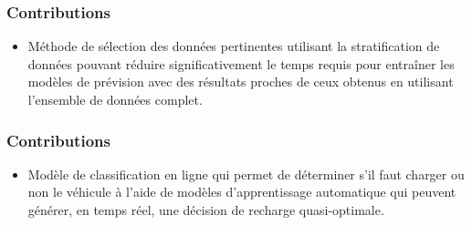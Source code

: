 \documentclass[french]{beamer}
\begin{document}
{\begin{frame}
\frametitle{Contributions}
\begin{itemize}
\item 
Méthode de sélection des données pertinentes utilisant la stratification de données pouvant réduire significativement le temps requis pour entraîner les modèles de prévision avec des résultats proches de ceux obtenus en utilisant l’ensemble de données complet.
\end{itemize}
% 
\end{frame}


\begin{frame}
\frametitle{Contributions}

\begin{itemize}
\item Modèle de classification en ligne qui permet de déterminer s’il faut charger ou non le véhicule à l’aide de modèles d’apprentissage automatique qui peuvent générer, en temps réel, une décision de recharge quasi-optimale.
\end{itemize}

\end{frame}



{ 
  
}}
\end{document}
